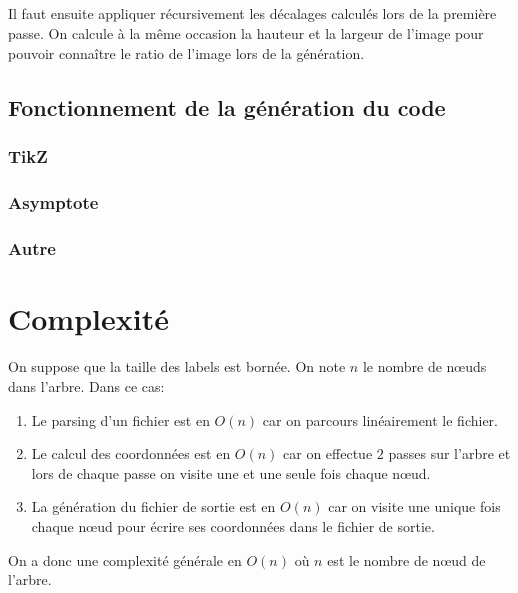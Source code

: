 

\subparagraph{}Il faut ensuite appliquer récursivement les décalages calculés lors de la première passe. On calcule à la même occasion la hauteur et la largeur de l'image pour pouvoir connaître le ratio de l'image lors de la génération.



	\subsection{Fonctionnement de la génération du code}
	
		\subsubsection*{TikZ}

		
		\subsubsection*{Asymptote}

		
		\subsubsection*{Autre}


\section{Complexité}

\paragraph{}On suppose que la taille des labels est bornée. On note $n$ le nombre de n\oe uds dans l'arbre. Dans ce cas:

\begin{enumerate}
	\item Le parsing d'un fichier est en $O(n)$ car on parcours linéairement le fichier.
	\item Le calcul des coordonnées est en $O(n)$ car on effectue $2$ passes sur l'arbre et lors de chaque passe on visite une et une seule fois chaque n\oe ud.
	\item La génération du fichier de sortie est en $O(n)$ car on visite une unique fois chaque n\oe ud pour écrire ses coordonnées dans le fichier de sortie.
\end{enumerate}
On a donc une complexité générale en $O(n)$ où $n$ est le nombre de n\oe ud de l'arbre.

